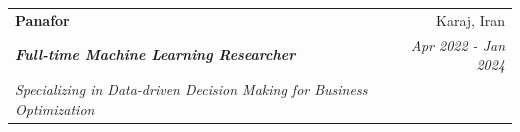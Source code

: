 \documentclass[letterpaper,11pt]{article}
\makeatletter
\newcommand{\resumeSubheading}[5]{
  \item
    \begin{tabular*}{0.97\textwidth}{l@{\extracolsep{\fill}}r}
      \textbf{#1} & #2 \\ 
      \textit{\small#3} & \textit{\small #4} \\
      \textit{#5} & 
    \end{tabular*}\vspace{-5pt}
}
\makeatother
\begin{document}
    \resumeSubheading
      {Panafor}{Karaj, Iran}
       {\textbf{Full-time Machine Learning Researcher}}
      {Apr 2022 - Jan 2024}{Specializing in Data-driven Decision Making for Business Optimization}
     
\end{document}
